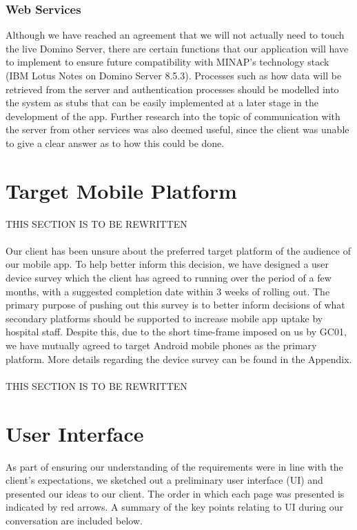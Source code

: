 \documentclass[12pt,a4paper,oneside,titlepage]{article}
\begin{document}
\subsubsection{Web Services}
Although we have reached an agreement that we will not actually need to touch the live Domino Server, there are certain functions that our application will have to implement to ensure future compatibility with MINAP's technology stack (IBM Lotus Notes on Domino Server 8.5.3). Processes such as how data will be retrieved from the server and authentication processes should be modelled into the system as stubs that can be easily implemented at a later stage in the development of the app. Further research into the topic of communication with the server from other services was also deemed useful, since the client was unable to give a clear answer as to how this could be done.

\newpage
\section{Target Mobile Platform}
THIS SECTION IS TO BE REWRITTEN
\\ \\
Our client has been unsure about the preferred target platform of the audience of our mobile app. To help better inform this decision, we have designed a user device survey which the client has agreed to running over the period of a few months, with a suggested completion date within 3 weeks of rolling out. The primary purpose of pushing out this survey is to better inform decisions of what secondary platforms should be supported to increase mobile app uptake by hospital staff. Despite this, due to the short time-frame imposed on us by GC01, we have mutually agreed to target Android mobile phones as the primary platform. More details regarding the device survey can be found in the Appendix.
\\ \\
THIS SECTION IS TO BE REWRITTEN

\newpage
\section{User Interface}
As part of ensuring our understanding of the requirements were in line with the client's expectations, we sketched out a preliminary user interface (UI) and presented our ideas to our client. The order in which each page was presented is indicated by red arrows. A summary of the key points relating to UI during our conversation are included below.
\end{document}
